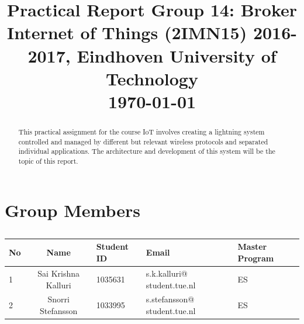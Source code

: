 \documentclass[conference]{IEEEtran}
\begin{document}
\title{Practical Report Group 14: Broker\\ {\fontsize{13}{0}\selectfont Internet of Things (2IMN15) 2016-2017, Eindhoven University of Technology} \\ {\fontsize{13}{0}\selectfont \today }}

\author{
	\and
	}
\maketitle

\IEEEpeerreviewmaketitle


\begin{abstract}
	This practical assignment for the course IoT involves creating a lightning system controlled and managed by different but relevant wireless protocols and separated individual applications. The architecture and development of this system will be the topic of this report.\\
	
\end{abstract}

\section{Group Members}
\begin{table}[htbp]
	\caption{}
	\begin{tabular}{lclL{1.6cm}L{1cm}}
		\toprule
		No & Name & Student ID & Email & Master Program \\ 
		 & Sai Krishna Kalluri & 1035631 & s.k.kalluri@ \newline student.tue.nl & ES \\ 
		2 & Snorri Stefansson & 1033995 & s.stefansson@ \newline student.tue.nl & ES \\ 
		\toprule
	\end{tabular}
	\label{}
\end{table}
\end{document}

